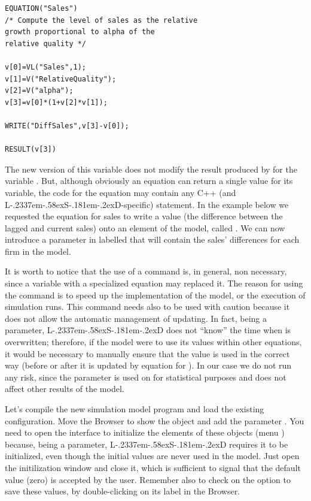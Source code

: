 \documentclass [11pt,a4paper] {book}
\def\LsD{{L\kern-.2337em\lower-.58ex\hbox{S}\kern-.181em\lower-.2ex\hbox{D}}\xspace}
\begin{document}
\small
\begin{verbatim}
EQUATION("Sales")
/* Compute the level of sales as the relative
growth proportional to alpha of the
relative quality */

v[0]=VL("Sales",1);
v[1]=V("RelativeQuality");
v[2]=V("alpha");
v[3]=v[0]*(1+v[2]*v[1]);

WRITE("DiffSales",v[3]-v[0]);

RESULT(v[3])
\end{verbatim}
\normalsize

The new version of this variable does not modify the result produced by for the variable . But, although obviously an equation can return a single value for its variable, the code for the equation may contain any C++ (and \LsD-specific) statement. In the example below we requested the equation for sales to write a value (the difference between the lagged and current sales) onto an element of the model, called . We can now introduce a parameter in  labelled  that will contain the sales' differences for each firm in the model.

It is worth to notice that the use of a  command is, in general, non necessary, since a variable with a specialized equation may replaced it. The reason for using the command  is to speed up the implementation of the model, or the execution of simulation runs. This command needs also to be used with caution because it does not allow the automatic management of updating. In fact, being a parameter, \LsD does not ``know'' the time when  is overwritten; therefore, if the model were to use its values within other equations, it would be necessary to manually ensure that the value is used in the correct way (before or after it is updated by equation for ). In our case we do not run any risk, since the parameter is used on for statistical purposes and does not affect other results of the model. 

Let's compile the new simulation model program and load the existing configuration. Move the Browser to show the object  and add the parameter . You need to open the interface to initialize the elements of these objects (menu ) because, being a parameter, \LsD requires it to be initialized, even though the initial values are never used in the model. Just open the initilization window and close it, which is sufficient to signal that the default value (zero) is accepted by the user. Remember also to check on the option to save these values, by double-clicking on its label in the Browser.
\end{document}
